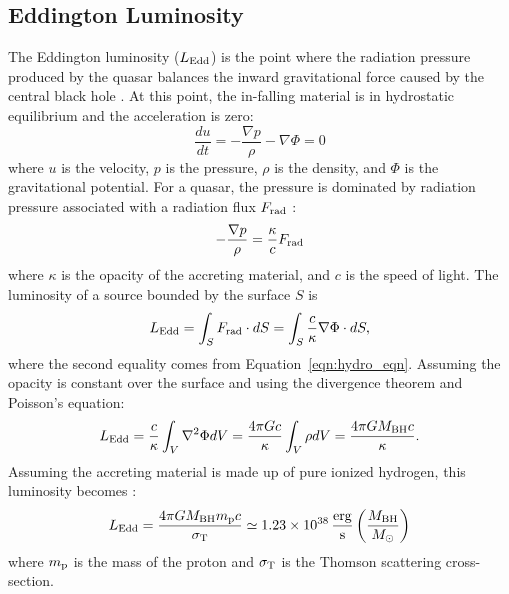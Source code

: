 \subsection{Eddington Luminosity} \label{Eddington_fraction}
The Eddington luminosity ($L_{\rm Edd}$) is the point where the radiation pressure produced by the quasar balances the inward gravitational force caused by the central black hole \citep{Rybicki:1986}.  At this point, the in-falling material is in hydrostatic equilibrium and the acceleration is zero:
\begin{equation} \label{eqn:hydro_eqn}
 \frac{du}{dt} = -\frac{\nabla p}{\rho} - \nabla \Phi = 0
\end{equation}
where $u$ is the velocity, $p$ is the pressure, $\rho$ is the density, and $\Phi$ is the gravitational potential.  For a quasar, the pressure is dominated by radiation pressure associated with a radiation flux $F_{\rm rad}$ \citep[e.g.][]{Stern:2014}:
\begin{equation}
 -\frac{\nabla p}{\rho} = \frac{\kappa}{c} F_{\rm rad}
\end{equation}
where $\kappa$ is the opacity of the accreting material, and $c$ is the speed of light.  The luminosity of a source bounded by the surface $S$ is
\begin{equation}
 L_{\rm Edd} = \int_S F_{\rm rad} \cdot dS = \int_S \frac{c}{\kappa} \nabla \Phi \cdot dS,
\end{equation}
where the second equality comes from Equation~\ref{eqn:hydro_eqn}.  Assuming the opacity is constant over the surface and using the divergence theorem and Poisson's equation:
\begin{equation}
L_{\rm Edd} = \frac{c}{\kappa} \int_V \nabla^2 \Phi dV = \frac{4\pi Gc}{\kappa} \int_V \rho dV = \frac{4\pi G M_{\rm BH} c}{\kappa}.
\end{equation}
Assuming the accreting material is made up of pure ionized hydrogen, this luminosity becomes \citep{Rybicki:1986}:
\begin{equation} \label{eqn:L_edd}
 L_{\rm Edd} = \frac{4\pi G M_{\rm BH} m_{\rm p} c}{\sigma_{\rm T}} \simeq 1.23 \times 10^{38}\, \frac{\rm erg}{\rm s} \left( \frac{M_{\rm BH}}{M_\sun} \right) 
\end{equation}
where $m_{\rm p}$ is the mass of the proton and $\sigma_{\rm T}$ is the Thomson scattering cross-section.%

